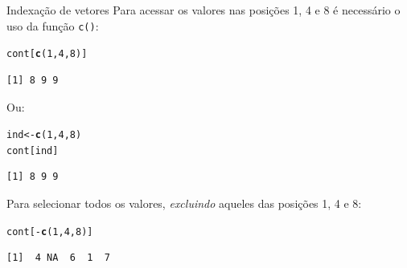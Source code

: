 \documentclass[10pt,handout]{beamer}\usepackage[]{graphicx}\usepackage[]{color}
\makeatletter
\newcommand{\hlnum}[1]{\textcolor[rgb]{0.686,0.059,0.569}{#1}}%
\newcommand{\hlopt}[1]{\textcolor[rgb]{0,0,0}{#1}}%
\newcommand{\hlstd}[1]{\textcolor[rgb]{0.345,0.345,0.345}{#1}}%
\newcommand{\hlkwb}[1]{\textcolor[rgb]{0.69,0.353,0.396}{#1}}%
\newcommand{\hlkwd}[1]{\textcolor[rgb]{0.737,0.353,0.396}{\textbf{#1}}}%
\newenvironment{kframe}{%
 \def\at@end@of@kframe{}%
 \ifinner\ifhmode%
  \def\at@end@of@kframe{\end{minipage}}%
  \begin{minipage}{\columnwidth}%
 \fi\fi%
 \def\FrameCommand##1{\hskip\@totalleftmargin \hskip-\fboxsep
 \colorbox{shadecolor}{##1}\hskip-\fboxsep
     \hskip-\linewidth \hskip-\@totalleftmargin \hskip\columnwidth}%
 \MakeFramed {\advance\hsize-\width
   \@totalleftmargin\z@ \linewidth\hsize
   \@setminipage}}%
 {\par\unskip\endMakeFramed%
 \at@end@of@kframe}
\newenvironment{knitrout}{}{} %
\makeatother
\begin{document}
\begin{frame}[fragile]{Indexação de vetores}
Para acessar os valores nas posições 1, 4 e 8 é necessário o uso da
função \texttt{c()}:
\begin{knitrout}\small
{}\color{fgcolor}\begin{kframe}
\begin{alltt}
\hlstd{cont[}\hlkwd{c}\hlstd{(}\hlnum{1}\hlstd{,} \hlnum{4}\hlstd{,} \hlnum{8}\hlstd{)]}
\end{alltt}
\begin{verbatim}
[1] 8 9 9
\end{verbatim}
\end{kframe}
\end{knitrout}
Ou:
\begin{knitrout}\small
{}\color{fgcolor}\begin{kframe}
\begin{alltt}
\hlstd{ind} \hlkwb{<-} \hlkwd{c}\hlstd{(}\hlnum{1}\hlstd{,} \hlnum{4}\hlstd{,} \hlnum{8}\hlstd{)}
\hlstd{cont[ind]}
\end{alltt}
\begin{verbatim}
[1] 8 9 9
\end{verbatim}
\end{kframe}
\end{knitrout}
Para selecionar todos os valores, \emph{excluindo} aqueles das posições
1, 4 e 8:
\begin{knitrout}\small
{}\color{fgcolor}\begin{kframe}
\begin{alltt}
\hlstd{cont[}\hlopt{-}\hlkwd{c}\hlstd{(}\hlnum{1}\hlstd{,} \hlnum{4}\hlstd{,} \hlnum{8}\hlstd{)]}
\end{alltt}
\begin{verbatim}
[1]  4 NA  6  1  7
\end{verbatim}
\end{kframe}
\end{knitrout}
\end{frame}
\end{document}
